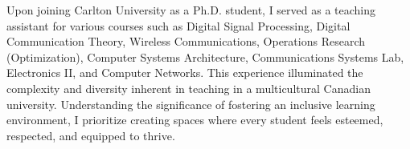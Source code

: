 \documentclass[11pt]{article}
\begin{document}



Upon joining Carlton University as a Ph.D. student, I served as a teaching assistant for various courses such as Digital Signal Processing, Digital Communication Theory, Wireless Communications, Operations Research (Optimization), Computer Systems Architecture, Communications Systems Lab, Electronics II, and Computer Networks. This experience illuminated the complexity and diversity inherent in teaching in a multicultural Canadian university. %
Understanding the significance of fostering an inclusive learning environment, I prioritize creating spaces where every student feels esteemed, respected, and equipped to thrive.


\end{document}
